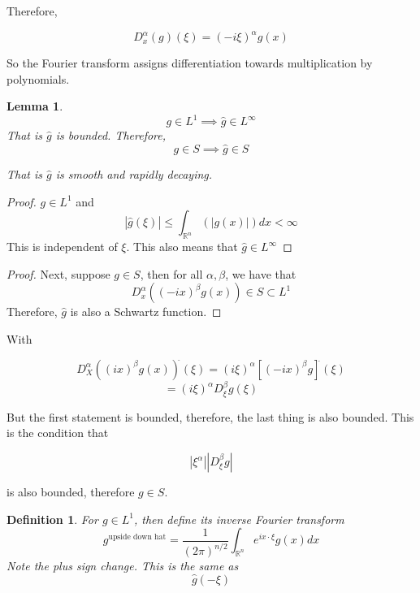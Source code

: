 \documentclass{article}
\newtheorem{lemma}[theorem]{Lemma}
\newtheorem{definition}[theorem]{Definition}
\newtheorem{one minute paper}[theorem]{One Minute Paper}
\begin{document}
Therefore, 

\begin{equation}
    D_x^{\alpha}\left( g \right)(\xi) = \left( -i\xi \right)^{\alpha}\hat{g}(x)
\end{equation}

So the Fourier transform assigns differentiation towards multiplication by polynomials. 

\begin{lemma}
    $$g \in L^1 \implies \hat{g} \in L^{\infty}$$
    That is $\hat{g}$ is bounded. Therefore, 
    $$g \in S \implies \hat{g} \in S$$

    That is $\hat{g}$ is smooth and rapidly decaying. 
\end{lemma}

\begin{proof}
    $g \in L^1$ and $$|\hat{g}(\xi)| \leq \int_{\mathbb{R}^n}\left( |g(x)| \right)dx < \infty$$ This is independent of $\xi$.
    This also means that $\hat{g} \in L^{\infty}$
\end{proof}

\begin{proof}
    Next, suppose $g \in S$, then for all $\alpha, \beta$, we have that 
    \begin{equation}
        D_{x}^{\alpha}\left( (-ix)^{\beta}g(x) \right) \in S \subset L^1
    \end{equation}
    Therefore, $\hat{g}$ is also a Schwartz function. 
\end{proof}

With

\begin{equation}
    D^{\alpha}_{X}\left( (ix)^{\beta}g(x) \right)^{\hat{}}(\xi) = (i\xi)^{\alpha}\left[ (-ix)^{\beta}g \right]^{\hat{}}(\xi)
\end{equation}
\begin{equation}
    = (i\xi)^{\alpha}D^{\beta}_{\xi}g(\xi)
\end{equation}

But the first statement is bounded, therefore, the last thing is also bounded. This is the condition that 

\begin{equation}
    |\xi^{\alpha}| |D^{\beta}_{\xi}g|
\end{equation}

is also bounded, therefore $g \in S$. 

\begin{definition}
    For $g \in L^1$, then define its inverse Fourier transform 
    \begin{equation}
        g^{\text{upside down hat}} = \frac{1}{(2\pi)^{n/2}}\int_{\mathbb{R}^n}e^{i x \cdot \xi}g(x)dx
    \end{equation}
    Note the plus sign change. This is the same as 
    \begin{equation}
        \hat{g}(-\xi)
    \end{equation}
\end{definition}
\end{document}
